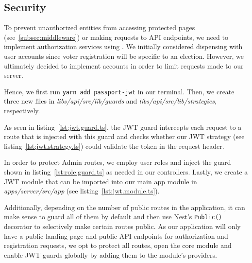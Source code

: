 \subsection{Security}\label{subsec:security}

To prevent unauthorized entities from accessing protected pages (see~\ref{subsec:middleware}) or making requests to \gls{API} endpoints, we need to implement authorization services using .
We initially considered dispensing with user accounts since voter registration will be specific to an election.
However, we ultimately decided to implement accounts in order to limit requests made to our server.

Hence, we first run \texttt{yarn add passport-jwt} in our terminal.
Then, we create three new files in \emph{libs/api/src/lib/guards} and \emph{libs/api/src/lib/strategies}, respectively.

As seen in listing~\ref{lst:jwt.guard.ts}, the \gls{JWT} guard intercepts each request to a route that is injected with this guard and checks whether our \gls{JWT} strategy (see listing~\ref{lst:jwt.strategy.ts}) could validate the token in the request header.


In order to protect \gls{Admin} routes, we employ user roles and inject the guard shown in listing~\ref{lst:role.guard.ts} as needed in our controllers.
Lastly, we create a \gls{JWT} module that can be imported into our main app module in \emph{apps/server/src/app} (see listing~\ref{lst:jwt.module.ts}).


Additionally, depending on the number of public routes in the application, it can make sense to guard all of them by default and then use Nest's \texttt{Public()} decorator to selectively make certain routes public.
As our application will only have a public landing page and public \gls{API} endpoints for authorization and registration requests, we opt to protect all routes, open the core module and enable \gls{JWT} guards globally by adding them to the module's providers.

